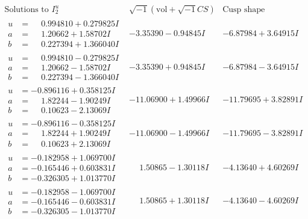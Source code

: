 \documentclass[1p]{elsarticle_modified}
\theoremstyle{definition}
\newcommand{\I}{\sqrt{-1}}
\begin{document}
$$\begin{array}{c|c|c}  
\text{Solutions to }I^u_{2}& \I (\text{vol} + \sqrt{-1}CS) & \text{Cusp shape}\\
 \hline 
\begin{aligned}
u &= \phantom{-}0.994810 + 0.279825 I \\
a &= \phantom{-}1.20662 + 1.58702 I \\
b &= \phantom{-}0.227394 + 1.366040 I\end{aligned}
 & -3.35390 - 0.94845 I & -6.87984 + 3.64915 I \\ \hline\begin{aligned}
u &= \phantom{-}0.994810 - 0.279825 I \\
a &= \phantom{-}1.20662 - 1.58702 I \\
b &= \phantom{-}0.227394 - 1.366040 I\end{aligned}
 & -3.35390 + 0.94845 I & -6.87984 - 3.64915 I \\ \hline\begin{aligned}
u &= -0.896116 + 0.358125 I \\
a &= \phantom{-}1.82244 - 1.90249 I \\
b &= \phantom{-}0.10623 - 2.13069 I\end{aligned}
 & -11.06900 + 1.49966 I & -11.79695 + 3.82891 I \\ \hline\begin{aligned}
u &= -0.896116 - 0.358125 I \\
a &= \phantom{-}1.82244 + 1.90249 I \\
b &= \phantom{-}0.10623 + 2.13069 I\end{aligned}
 & -11.06900 - 1.49966 I & -11.79695 - 3.82891 I \\ \hline\begin{aligned}
u &= -0.182958 + 1.069700 I \\
a &= -0.165446 + 0.603831 I \\
b &= -0.326305 + 1.013770 I\end{aligned}
 & \phantom{-}1.50865 - 1.30118 I & -4.13640 + 4.60269 I \\ \hline\begin{aligned}
u &= -0.182958 - 1.069700 I \\
a &= -0.165446 - 0.603831 I \\
b &= -0.326305 - 1.013770 I\end{aligned}
 & \phantom{-}1.50865 + 1.30118 I & -4.13640 - 4.60269 I \\ \hline\begin{aligned}

\end{aligned}
\end{array}$$
\end{document}
